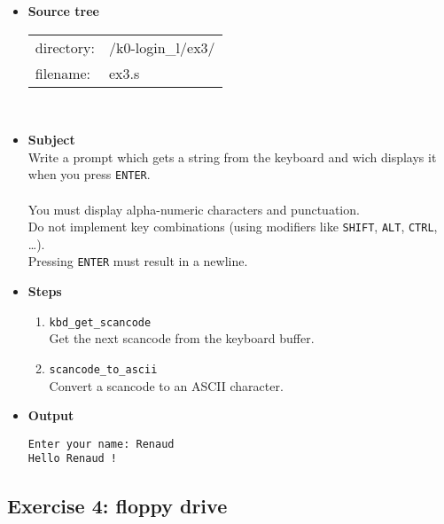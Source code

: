 \begin{itemize}
\item {\bf Source tree}\\
\begin{tabular}{p{4cm}l}
directory: & /k0-login\_l/ex3/\\
filename: & ex3.s
\end{tabular}
\\
\item {\bf Subject}\\
Write a prompt which gets a string from the keyboard and wich displays it when you press {\tt ENTER}.\\
\\
You must display alpha-numeric characters and punctuation.\\
Do not implement key combinations (using modifiers like {\tt SHIFT}, {\tt ALT}, {\tt CTRL}, \ldots).\\
Pressing {\tt ENTER} must result in a newline.\\
\item {\bf Steps}
  \begin{enumerate}
  \item {\tt kbd\_get\_scancode}\\
  Get the next scancode from the keyboard buffer.
  \item {\tt scancode\_to\_ascii}\\
  Convert a scancode to an ASCII character.
\\
  \end{enumerate}
\item {\bf Output}
\begin{verbatim}
Enter your name: Renaud
Hello Renaud !
\end{verbatim}
\end{itemize}

\newpage

\subsection*{Exercise 4: floppy drive}

